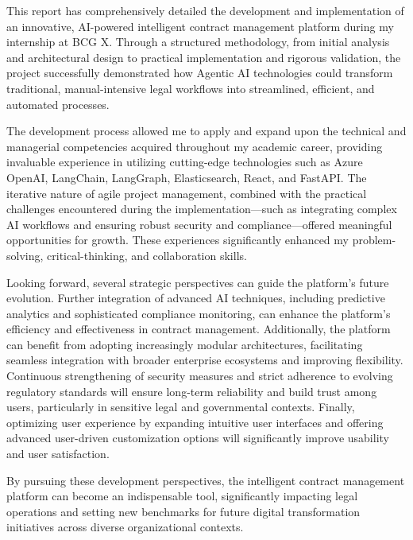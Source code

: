 This report has comprehensively detailed the development and implementation of an innovative, AI-powered intelligent contract management platform during my internship at BCG X. Through a structured methodology, from initial analysis and architectural design to practical implementation and rigorous validation, the project successfully demonstrated how Agentic AI technologies could transform traditional, manual-intensive legal workflows into streamlined, efficient, and automated processes.\mynewline

The development process allowed me to apply and expand upon the technical and managerial competencies acquired throughout my academic career, providing invaluable experience in utilizing cutting-edge technologies such as Azure OpenAI, LangChain, LangGraph, Elasticsearch, React, and FastAPI. The iterative nature of agile project management, combined with the practical challenges encountered during the implementation—such as integrating complex AI workflows and ensuring robust security and compliance—offered meaningful opportunities for growth. These experiences significantly enhanced my problem-solving, critical-thinking, and collaboration skills.\mynewline

Looking forward, several strategic perspectives can guide the platform's future evolution. Further integration of advanced AI techniques, including predictive analytics and sophisticated compliance monitoring, can enhance the platform's efficiency and effectiveness in contract management. Additionally, the platform can benefit from adopting increasingly modular architectures, facilitating seamless integration with broader enterprise ecosystems and improving flexibility. Continuous strengthening of security measures and strict adherence to evolving regulatory standards will ensure long-term reliability and build trust among users, particularly in sensitive legal and governmental contexts. Finally, optimizing user experience by expanding intuitive user interfaces and offering advanced user-driven customization options will significantly improve usability and user satisfaction.\mynewline

By pursuing these development perspectives, the intelligent contract management platform can become an indispensable tool, significantly impacting legal operations and setting new benchmarks for future digital transformation initiatives across diverse organizational contexts.